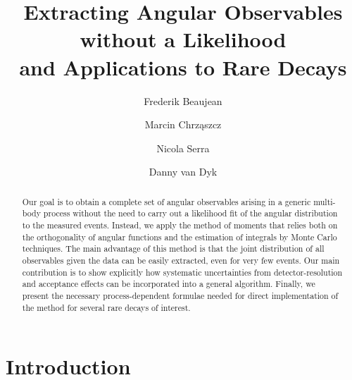 \documentclass[aps,nofootinbib,preprintnumbers,prd,twocolumn]{revtex4-1}
\begin{document}
\allowdisplaybreaks

\title{Extracting Angular Observables without a Likelihood\\and Applications to Rare Decays}
\author{Frederik Beaujean}
\author{Marcin Chrz\k{a}szcz}
\author{Nicola Serra}
\author{Danny van Dyk}

\begin{abstract}
  Our goal is to obtain a complete set of angular observables
  arising in a generic multi-body process without the need to carry
  out a likelihood fit of the angular distribution to the measured
  events. Instead, we apply the method of moments that relies
  both on the orthogonality of angular functions and the estimation of
  integrals by Monte Carlo techniques. The main advantage of
  this method is that the joint distribution of all observables
  given the data can be easily extracted, even for very few
  events. Our main contribution is to show explicitly how systematic
  uncertainties from detector-resolution and acceptance effects can
  be incorporated into a general algorithm. Finally, we present the
  necessary process-dependent formulae needed for direct
  implementation of the method for several rare decays of
  interest.
\end{abstract}

\maketitle

\section{Introduction}
\label{sec:intro}
\end{document}

